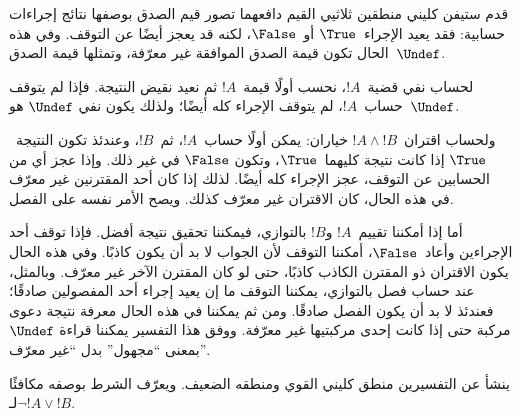 \documentclass[../../../include/open-logic-section]{subfiles}
\begin{document}


قدم ستيفن كليني منطقين ثلاثيي القيم دافعهما تصور قيم الصدق بوصفها
نتائج إجراءات حسابية: فقد يعيد الإجراء~$\True$ أو~$\False$، لكنه قد
يعجز أيضًا عن التوقف. وفي هذه الحال تكون قيمة الصدق الموافقة غير
معرّفة، وتمثلها قيمة الصدق~$\Undef$.

لحساب نفي قضية~$!A$، نحسب أولًا قيمة~$!A$ ثم نعيد نقيض النتيجة. فإذا
لم يتوقف حساب~$!A$، لم يتوقف الإجراء كله أيضًا؛ ولذلك يكون نفي
$\Undef$ هو~$\Undef$.

ولحساب اقتران~$!A \land !B$ خياران: يمكن أولًا حساب~$!A$، ثم~$!B$،
وعندئذ تكون النتيجة~$\True$ إذا كانت نتيجة كليهما~$\True$، وتكون
$\False$ في غير ذلك. وإذا عجز أي من الحسابين عن التوقف، عجز الإجراء
كله أيضًا. لذلك إذا كان أحد المقترنين غير معرّف في هذه الحال، كان
الاقتران غير معرّف كذلك. ويصح الأمر نفسه على الفصل.

أما إذا أمكننا تقييم~$!A$ و$!B$ بالتوازي، فيمكننا تحقيق نتيجة أفضل.
فإذا توقف أحد الإجراءين وأعاد~$\False$، أمكننا التوقف لأن الجواب لا بد
أن يكون كاذبًا. وفي هذه الحال يكون الاقتران ذو المقترن الكاذب كاذبًا،
حتى لو كان المقترن الآخر غير معرّف. وبالمثل، عند حساب فصل بالتوازي،
يمكننا التوقف ما إن يعيد إجراء أحد المفصولين صادقًا؛ فعندئذ لا بد أن
يكون الفصل صادقًا. ومن ثم يمكننا في هذه الحال معرفة نتيجة دعوى مركبة
حتى إذا كانت إحدى مركبتيها غير معرّفة. ووفق هذا التفسير يمكننا قراءة
$\Undef$ بمعنى ``مجهول'' بدل ``غير معرّف''.

ينشأ عن التفسيرين منطق كليني القوي ومنطقه الضعيف. ويعرّف الشرط بوصفه
مكافئًا لـ$\lnot !A \lor !B$.
\end{document}
